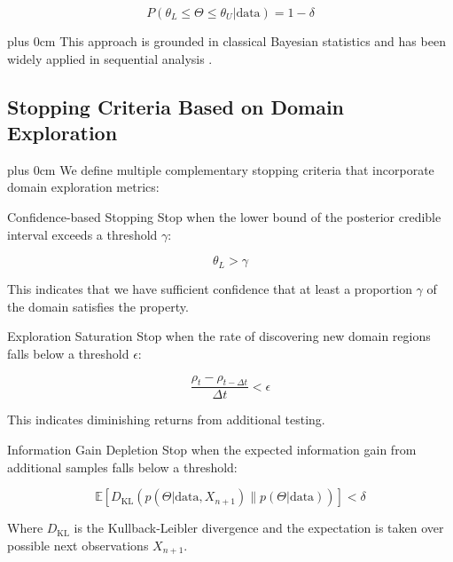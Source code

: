 \documentclass[conference]{IEEEtran}
\newcommand{\justifytext}{\leftskip=0pt \rightskip=0pt plus 0cm}
\begin{document}
\begin{equation}
P(\theta_L \leq \Theta \leq \theta_U | \text{data}) = 1 - \delta
\end{equation}

\justifytext
This approach is grounded in classical Bayesian statistics \cite{berger2013} and has been widely applied in sequential analysis \cite{wald1947}.

\subsection{Stopping Criteria Based on Domain Exploration}

\justifytext
We define multiple complementary stopping criteria that incorporate domain exploration metrics:

\begin{definitionbox}{Confidence-based Stopping}
Stop when the lower bound of the posterior credible interval exceeds a threshold $\gamma$:

\begin{equation}
\theta_L > \gamma
\end{equation}

This indicates that we have sufficient confidence that at least a proportion $\gamma$ of the domain satisfies the property.
\end{definitionbox}

\begin{definitionbox}{Exploration Saturation}
Stop when the rate of discovering new domain regions falls below a threshold $\epsilon$:

\begin{equation}
\frac{\rho_t - \rho_{t-\Delta t}}{\Delta t} < \epsilon
\end{equation}

This indicates diminishing returns from additional testing.
\end{definitionbox}

\begin{definitionbox}{Information Gain Depletion}
Stop when the expected information gain from additional samples falls below a threshold:

\begin{equation}
\mathbb{E}[D_{\text{KL}}(p(\Theta|\text{data}, X_{n+1}) \| p(\Theta|\text{data}))] < \delta
\end{equation}

Where $D_{\text{KL}}$ is the Kullback-Leibler divergence and the expectation is taken over possible next observations $X_{n+1}$.
\end{definitionbox}
\end{document}

